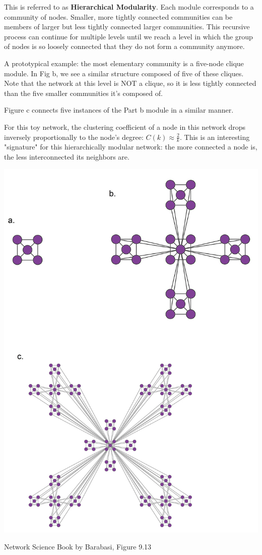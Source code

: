 \documentclass[11pt]{scrartcl} %
\begin{document}
This is referred to as \textbf{Hierarchical Modularity}. Each module corresponds to a community of nodes. Smaller, more tightly connected communities can be members of larger but less tightly connected larger communities. This recursive process can continue for multiple levels until we reach a level in which the group of nodes is so loosely connected that they do not form a community anymore.  

A prototypical example: the most elementary community is a five-node clique module. In Fig b, we see a similar structure composed of five of these cliques. Note that the network at this level is NOT a clique, so it is less tightly connected than the five smaller communities it's composed of.

Figure c connects five instances of the Part b module in a similar manner.

For this toy network, the clustering coefficient of a node in this network drops inversely proportionally to the node's degree: $C(k) \approx \frac{2}{k}$. This is an interesting "signature" for this hierarchically modular network: the more connected a node is, the less interconnected its neighbors are.

\begin{center}
\includegraphics[width=0.75\linewidth]{img/L7.4-CommunitiesWithinCommunities.jpg}

{\tiny Network Science Book by Barabasi, Figure 9.13}
\end{center}
\end{document}

